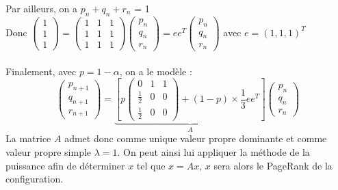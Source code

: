 \documentclass[a4paper,10pt]{report}
\begin{document}
\noindent Par ailleurs, on a $p_n+q_n+r_n$ = 1\\
Donc $\left( \begin{array}{c} 1 \\ 1 \\ 1 \end{array} \right) =
\left( \begin{array}{ccc} 1 & 1 & 1 \\ 1 & 1 & 1 \\ 1 & 1 & 1 \end{array} \right)\left( \begin{array}{c} p_{n} \\ q_{n} \\ r_{n} \end{array} \right)
= ee^T\left( \begin{array}{c} p_{n} \\ q_{n} \\ r_{n} \end{array} \right)$ avec $e=(1,1,1)^T$\\ \\

Finalement, avec $p=1-\alpha$, on a le modèle :
\begin{equation}
\left( \begin{array}{c} p_{n+1} \\ q_{n+1} \\ r_{n+1} \end{array} \right)
= \underbrace{\left[p \left( \begin{array}{ccc} 0 & 1 & 1 \\ \frac{1}{2} & 0 & 0 \\ \frac{1}{2} & 0 & 0 \end{array} \right)
+ (1-p)\times \frac{1}{3}ee^T \right]}_A
\left( \begin{array}{c} p_{n} \\ q_{n} \\ r_{n} \end{array} \right)
\label{modele}
\end{equation}
La matrice $A$ admet donc comme unique valeur propre dominante et comme valeur propre simple $\lambda=1$. On peut ainsi lui appliquer la méthode de la puissance afin de déterminer $x$ tel que $x=Ax$, $x$ sera alors le PageRank de la configuration.\\ \\
\end{document}
